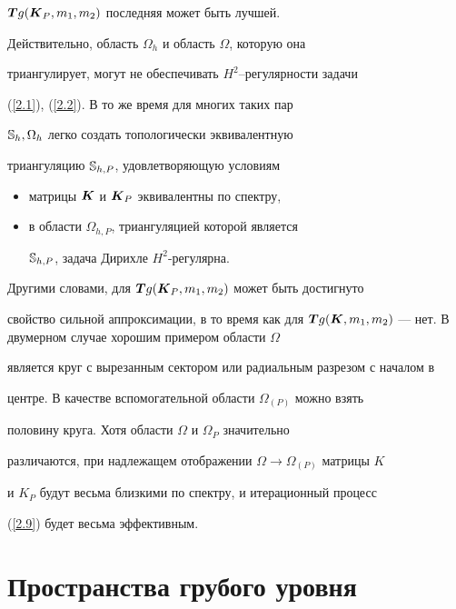 $\boldsymbol Tg(\boldsymbol K_P,m_1,m_2)$ последняя может быть лучшей.


Действительно, область $\Omega_h$ и область $\Omega$, которую она


триангулирует, могут не обеспечивать $H^2$--регулярности задачи


(\ref{2.1}), (\ref{2.2}). В то же время для многих таких пар


$\Bbb S_h, \Omega_h$ легко создать топологически эквивалентную


триангуляцию $\Bbb S_{h,P}$, удовлетворяющую условиям


\begin{itemize}


\item[---] матрицы $\boldsymbol K $ и $\boldsymbol K_P$ эквивалентны по спектру,


\item[---] в области $\Omega_{h,P}$, триангуляцией которой является


$\Bbb S_{h,P}$, задача Дирихле $H^2$-регулярна.


\end{itemize}





Другими словами, для $\boldsymbol Tg(\boldsymbol K_P,m_1,m_2)$ может быть достигнуто


свойство сильной аппроксимации, в то время как для $\bi Tg(\bi K,m_1,


m_2)$ --- нет. В двумерном случае хорошим примером области $\Omega$


является круг с вырезанным сектором или радиальным разрезом с началом в


центре. В качестве вспомогательной области $\Omega_{(P)}$ можно взять


половину круга. Хотя области $\Omega$ и $\Omega_P$ значительно


различаются, при надлежащем отображении $\Omega\to\Omega_{(P)}$ матрицы $K$


и $K_P$ будут весьма близкими по спектру, и итерационный процесс


(\ref{2.9}) будет весьма эффективным.





\section{ Пространства грубого уровня}





